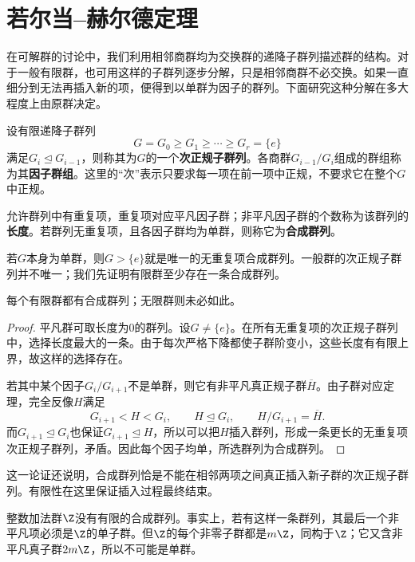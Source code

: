\section{若尔当--赫尔德定理}

在可解群的讨论中，我们利用相邻商群均为交换群的递降子群列描述群的结构。对于一般有限群，也可用这样的子群列逐步分解，只是相邻商群不必交换。如果一直细分到无法再插入新的项，便得到以单群为因子的群列。下面研究这种分解在多大程度上由原群决定。

\begin{definition}
设有限递降子群列
\[
G=G_0\geq G_1\geq\cdots\geq G_r=\{e\}
\]
满足$G_i\trianglelefteq G_{i-1}$，则称其为$G$的一个\textbf{次正规子群列}。各商群$G_{i-1}/G_i$组成的群组称为其\textbf{因子群组}。这里的“次”表示只要求每一项在前一项中正规，不要求它在整个$G$中正规。

允许群列中有重复项，重复项对应平凡因子群；非平凡因子群的个数称为该群列的\textbf{长度}。若群列无重复项，且各因子群均为单群，则称它为\textbf{合成群列}。
\end{definition}

若$G$本身为单群，则$G>\{e\}$就是唯一的无重复项合成群列。一般群的次正规子群列并不唯一；我们先证明有限群至少存在一条合成群列。

\begin{proposition}
每个有限群都有合成群列；无限群则未必如此。
\end{proposition}
\begin{proof}
平凡群可取长度为0的群列。设$G\ne\{e\}$。在所有无重复项的次正规子群列中，选择长度最大的一条。由于每次严格下降都使子群阶变小，这些长度有有限上界，故这样的选择存在。

若其中某个因子$G_i/G_{i+1}$不是单群，则它有非平凡真正规子群$\overline H$。由子群对应定理，完全反像$H$满足
\[
G_{i+1}<H<G_i,\qquad H\trianglelefteq G_i,
\qquad H/G_{i+1}=\overline H.
\]
而$G_{i+1}\trianglelefteq G_i$也保证$G_{i+1}\trianglelefteq H$，所以可以把$H$插入群列，形成一条更长的无重复项次正规子群列，矛盾。因此每个因子均单，所选群列为合成群列。
\end{proof}

这一论证还说明，合成群列恰是不能在相邻两项之间真正插入新子群的次正规子群列。有限性在这里保证插入过程最终结束。

\begin{example}
整数加法群$\Z$没有有限的合成群列。事实上，若有这样一条群列，其最后一个非平凡项必须是$\Z$的单子群。但$\Z$的每个非零子群都是$m\Z$，同构于$\Z$；它又含非平凡真子群$2m\Z$，所以不可能是单群。
\end{example}

